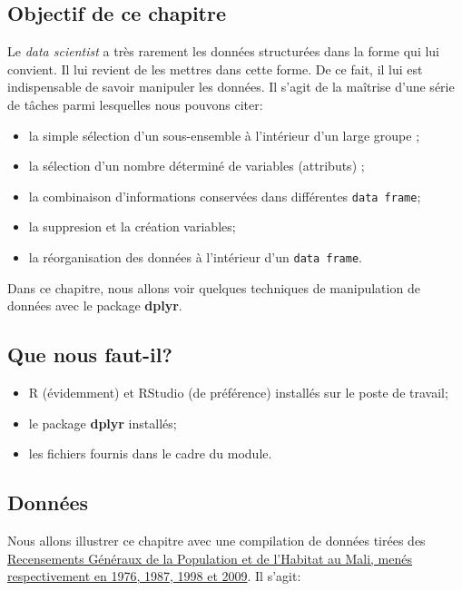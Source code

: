 \documentclass[]{book}
\begin{document}
\subsection{Objectif de ce chapitre}\label{objectif-de-ce-chapitre}

Le \emph{data scientist} a très rarement les données structurées dans la
forme qui lui convient. Il lui revient de les mettres dans cette forme.
De ce fait, il lui est indispensable de savoir manipuler les données. Il
s'agit de la maîtrise d'une série de tâches parmi lesquelles nous
pouvons citer:

\begin{itemize}
\item
  la simple sélection d'un sous-ensemble à l'intérieur d'un large groupe
  ;
\item
  la sélection d'un nombre déterminé de variables (attributs) ;
\item
  la combinaison d'informations conservées dans différentes
  \texttt{data\ frame};
\item
  la suppresion et la création variables;
\item
  la réorganisation des données à l'intérieur d'un \texttt{data\ frame}.
\end{itemize}

Dans ce chapitre, nous allons voir quelques techniques de manipulation
de données avec le package \textbf{dplyr}.

\subsection{Que nous faut-il?}\label{que-nous-faut-il-1}

\begin{itemize}
\item
  R (évidemment) et RStudio (de préférence) installés sur le poste de
  travail;
\item
  le package \textbf{dplyr} installés;
\item
  les fichiers fournis dans le cadre du module.
\end{itemize}

\subsection{Données}\label{donnees-2}

Nous allons illustrer ce chapitre avec une compilation de données tirées
des \href{https://www.malikunnafoni.com}{Recensements Généraux de la
Population et de l'Habitat au Mali, menés respectivement en 1976, 1987,
1998 et 2009}. Il s'agit:
\end{document}
